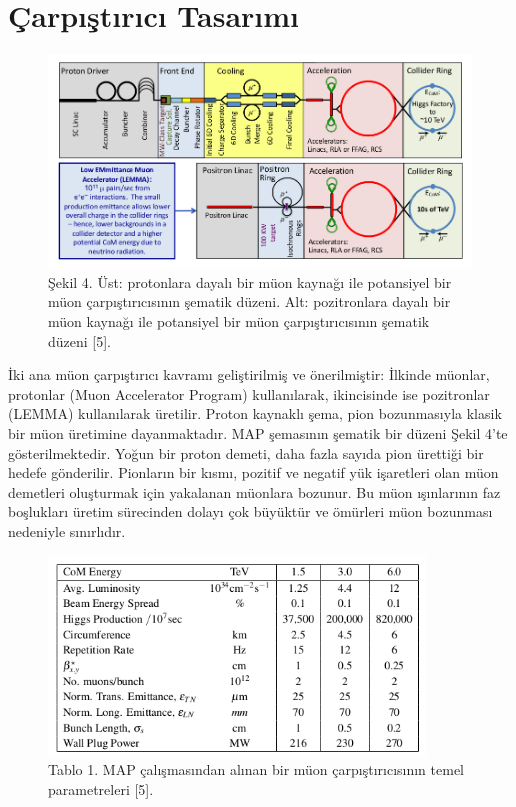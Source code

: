 \documentclass{article}
\begin{document}
\section{Çarpıştırıcı Tasarımı}

\begin{figure}[h]
 \centering
\includegraphics[width=13cm]{image/Ekran Görüntüsü - 2021-06-23 09-42-14.png}
\caption*{Şekil 4. Üst: protonlara dayalı bir müon kaynağı ile potansiyel bir müon çarpıştırıcısının şematik düzeni. Alt: pozitronlara dayalı bir müon kaynağı ile potansiyel bir müon çarpıştırıcısının şematik düzeni [5].}
	\end{figure}

İki ana müon çarpıştırıcı kavramı geliştirilmiş ve önerilmiştir: İlkinde müonlar, protonlar (Muon Accelerator Program) kullanılarak, ikincisinde ise pozitronlar (LEMMA) kullanılarak üretilir. Proton kaynaklı şema, pion bozunmasıyla klasik bir müon üretimine dayanmaktadır. MAP şemasının şematik bir düzeni Şekil 4'te gösterilmektedir. Yoğun bir proton demeti, daha fazla sayıda pion ürettiği bir hedefe gönderilir. Pionların bir kısmı, pozitif ve negatif yük işaretleri olan müon demetleri oluşturmak için yakalanan müonlara bozunur. Bu müon ışınlarının faz boşlukları üretim sürecinden dolayı çok büyüktür ve ömürleri müon bozunması nedeniyle sınırlıdır. 

\begin{figure}[h]
 \centering
\includegraphics[width=10cm]{image/Ekran Görüntüsü - 2021-06-23 10-07-39.png}
\caption*{Tablo 1. MAP çalışmasından alınan bir müon çarpıştırıcısının temel parametreleri [5].}
	\end{figure}
\end{document}
